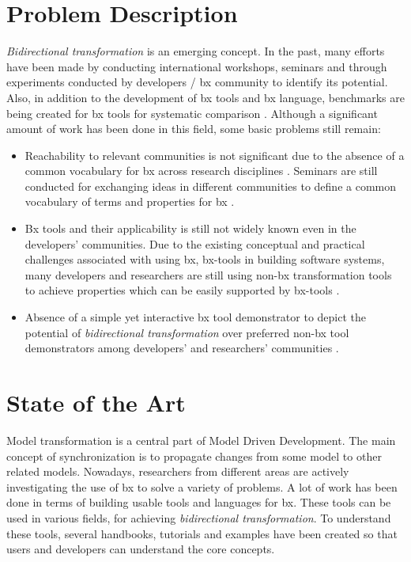 \section{Problem Description}\label{sec:problem}
\textit{Bidirectional transformation} is an emerging concept. In the past, many efforts have been made by conducting international workshops, seminars and through experiments conducted by developers / bx community to identify its potential. Also, in addition to the development of bx tools and bx language, benchmarks are being created for bx tools for systematic comparison \cite{benchmark-BX}.
\newline\newline  Although a significant amount of work has been done in this field, some basic problems still remain:
\begin{itemize}
	\item {Reachability to relevant communities is not significant due to the absence of a common vocabulary for bx across research disciplines \cite{bx-theoryandappl}. Seminars are still conducted for exchanging ideas in different communities to define a common vocabulary of terms and properties for bx \cite{bx-dagstuhl}.}	
	\item {Bx tools and their applicability is still not widely known even in the developers' communities. Due to the existing conceptual and practical challenges associated with using bx, bx-tools in building software systems, many developers and researchers are still using non-bx transformation tools to achieve properties which can be easily supported by bx-tools \cite{bx-theoryandappl}.}
	\item {Absence of a simple yet interactive bx tool demonstrator to depict the potential of \textit{bidirectional transformation} over preferred non-bx tool demonstrators among developers' and researchers' communities \cite{bx-theoryandappl}.}
\end{itemize}

\section{State of the Art}\label{sec:stateofart}
Model transformation is a central part of Model Driven Development. The main concept of synchronization is to propagate changes from some model to other related models.
\newline\newline Nowadays, researchers from different areas are actively investigating the use of bx to solve a variety of problems. A lot of work has been done in terms of building usable tools and languages for bx. These tools can be used in various fields, for achieving \textit{bidirectional transformation}. To understand these tools, several handbooks, tutorials and examples have been created so that users and developers can understand the core concepts. 
